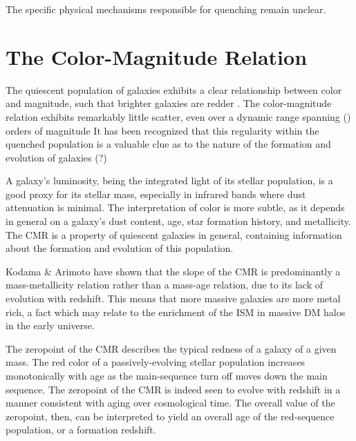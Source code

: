 The specific physical mechanisms responsible for quenching remain unclear.

\section{The Color-Magnitude Relation}

The quiescent population of galaxies exhibits a clear relationship between color and magnitude, such that brighter galaxies are redder \citep{Bower:1992mb,van-Dokkum:1998wd,Baldry:2004oq,Bell:2004qe}.
The color-magnitude relation exhibits remarkably little scatter, even over a dynamic range spanning () orders of magnitude
It has been recognized that this regularity within the quenched population is a valuable clue as to the nature of the formation and evolution of galaxies (?)


A galaxy's luminosity, being the integrated light of its stellar population, is a good proxy for its stellar mass, especially in infrared bands where dust attenuation is minimal.
The interpretation of color is more subtle, as it depends in general on a galaxy's dust content, age, star formation history, and metallicity.
The CMR is a property of quiescent galaxies in general, containing information about the formation and evolution of this population.

Kodama \& Arimoto have shown that the slope of the CMR is predominantly a mass-metallicity relation rather than a mass-age relation, due to its lack of evolution with redshift.
This means that more massive galaxies are more metal rich, a fact which may relate to the enrichment of the ISM in massive DM halos in the early universe.

The zeropoint of the CMR describes the typical redness of a galaxy of a given mass.
The red color of a passively-evolving stellar population increases monotonically with age as the main-sequence turn off moves down the main sequence.
The zeropoint of the CMR is indeed seen to evolve with redshift in a manner consistent with aging over cosmological time.
The overall value of the zeropoint, then, can be interpreted to yield an overall age of the red-sequence population, or a formation redshift.

